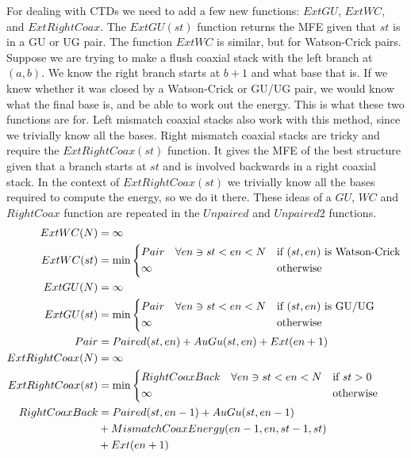 \documentclass{cshonours}
\begin{document}
For dealing with CTDs we need to add a few new functions: $ExtGU$, $ExtWC$, and $ExtRightCoax$. The $ExtGU(st)$ function returns the MFE given that $st$ is in a GU or UG pair. The function $ExtWC$ is similar, but for Watson-Crick pairs. Suppose we are trying to make a flush coaxial stack with the left branch at $(a, b)$. We know the right branch starts at $b + 1$ and what base that is. If we knew whether it was closed by a Watson-Crick or GU/UG pair, we would know what the final base is, and be able to work out the energy. This is what these two functions are for. Left mismatch coaxial stacks also work with this method, since we trivially know all the bases. Right mismatch coaxial stacks are tricky and require the $ExtRightCoax(st)$ function. It gives the MFE of the best structure given that a branch starts at $st$ and is involved backwards in a right coaxial stack. In the context of $ExtRightCoax(st)$ we trivially know all the bases required to compute the energy, so we do it there. These ideas of a $GU$, $WC$ and $RightCoax$ function are repeated in the $Unpaired$ and $Unpaired2$ functions.
\begin{align*}
ExtWC(N) &= \infty \\
ExtWC(st) &= \min{\begin{dcases*}
  Pair \quad \forall en \ni st < en < N & if $(st, en)$ is Watson-Crick \\
  \infty & otherwise \\
\end{dcases*}} \\
ExtGU(N) &= \infty \\
ExtGU(st) &= \min{\begin{dcases*}
  Pair \quad \forall en \ni st < en < N & if $(st, en)$ is GU/UG \\
  \infty & otherwise \\
\end{dcases*}} \\
Pair &= Paired(st, en) + AuGu(st, en) + Ext(en + 1) \\
ExtRightCoax(N) &= \infty \\
ExtRightCoax(st) &= \min{\begin{dcases*}
  RightCoaxBack \quad \forall en \ni st < en < N & if $st > 0$ \\
  \infty & otherwise \\
\end{dcases*}} \\
RightCoaxBack &= Paired(st, en - 1) + AuGu(st, en - 1) \\
  &+ MismatchCoaxEnergy(en - 1, en, st - 1, st) \\
  & + Ext(en + 1) \\
\end{align*}
\end{document}
